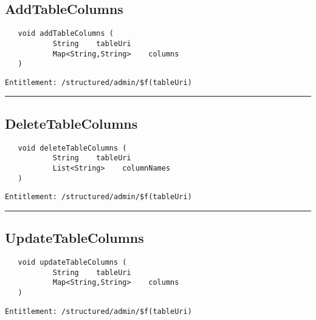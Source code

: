 \subsection{AddTableColumns}
\label{Api:AddTableColumns}
\begin{verbatim}
   void addTableColumns (
           String    tableUri
           Map<String,String>    columns
   )
\end{verbatim}
\begin{Verbatim}[fontsize=\small, formatcom=\color{Maroon}]
  Entitlement: /structured/admin/$f(tableUri)
\end{Verbatim}



\rule{12cm}{2pt}
\subsection{DeleteTableColumns}
\label{Api:DeleteTableColumns}
\begin{verbatim}
   void deleteTableColumns (
           String    tableUri
           List<String>    columnNames
   )
\end{verbatim}
\begin{Verbatim}[fontsize=\small, formatcom=\color{Maroon}]
  Entitlement: /structured/admin/$f(tableUri)
\end{Verbatim}



\rule{12cm}{2pt}
\subsection{UpdateTableColumns}
\label{Api:UpdateTableColumns}
\begin{verbatim}
   void updateTableColumns (
           String    tableUri
           Map<String,String>    columns
   )
\end{verbatim}
\begin{Verbatim}[fontsize=\small, formatcom=\color{Maroon}]
  Entitlement: /structured/admin/$f(tableUri)
\end{Verbatim}



